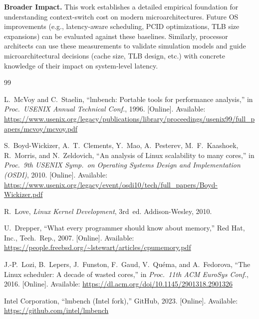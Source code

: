 \documentclass[conference]{IEEEtran}
\begin{document}
\textbf{Broader Impact.}
This work establishes a detailed empirical foundation for understanding context-switch
cost on modern microarchitectures. Future OS improvements (e.g., latency-aware scheduling,
PCID optimizations, TLB size expansions) can be evaluated against these baselines.
Similarly, processor architects can use these measurements to validate simulation models
and guide microarchitectural decisions (cache size, TLB design, etc.) with concrete
knowledge of their impact on system-level latency.

\balance   %

\begin{thebibliography}{99}

L.~McVoy and C.~Staelin,
``lmbench: Portable tools for performance analysis,''
in \textit{Proc.\ USENIX Annual Technical Conf.}, 1996.
[Online]. Available: \url{https://www.usenix.org/legacy/publications/library/proceedings/usenix99/full_papers/mcvoy/mcvoy.pdf}

S.~Boyd-Wickizer, A.~T.\ Clements, Y.~Mao, A.~Pesterev, M.~F.\ Kaashoek,
R.~Morris, and N.~Zeldovich,
``An analysis of Linux scalability to many cores,''
in \textit{Proc.\ 9th USENIX Symp.\ on Operating Systems Design and
Implementation (OSDI)}, 2010.
[Online]. Available: \url{https://www.usenix.org/legacy/event/osdi10/tech/full_papers/Boyd-Wickizer.pdf}

R.~Love,
\textit{Linux Kernel Development}, 3rd~ed.
Addison-Wesley, 2010.

U.~Drepper,
``What every programmer should know about memory,''
Red Hat, Inc., Tech.\ Rep., 2007.
[Online]. Available: \url{https://people.freebsd.org/~lstewart/articles/cpumemory.pdf}

J.-P.~Lozi, B.~Lepers, J.~Funston, F.~Gaud, V.~Qu\'ema, and A.~Fedorova,
``The Linux scheduler: A decade of wasted cores,''
in \textit{Proc.\ 11th ACM EuroSys Conf.}, 2016.
[Online]. Available: \url{https://dl.acm.org/doi/10.1145/2901318.2901326}

Intel Corporation,
``lmbench (Intel fork),''
GitHub, 2023.
[Online]. Available: \url{https://github.com/intel/lmbench}

\end{thebibliography}
\end{document}
